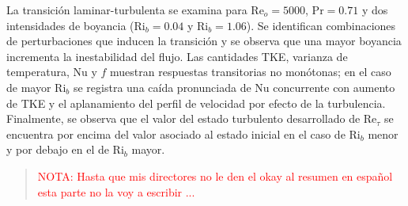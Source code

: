 \begin{resumen}

La transición laminar-turbulenta se examina para $\mathrm{Re}_o=5000$, $\mathrm{Pr}=0\text{.}71$ y dos intensidades de boyancia ($\mathrm{Ri}_b=0\text{.}04$ y $\mathrm{Ri}_b=1\text{.}06$). Se identifican combinaciones de perturbaciones que inducen la transición y se observa que una mayor boyancia incrementa la inestabilidad del flujo. Las cantidades TKE, varianza de temperatura, Nu y $f$ muestran respuestas transitorias no monótonas; en el caso de mayor $\mathrm{Ri}_b$ se registra una caída pronunciada de Nu concurrente con aumento de TKE y el aplanamiento del perfil de velocidad por efecto de la turbulencia. Finalmente, se observa que el valor del estado turbulento desarrollado de $\mathrm{Re}_\tau$ se encuentra por encima del valor asociado al estado inicial en el caso de $\mathrm{Ri}_b$ menor y por debajo en el de $\mathrm{Ri}_b$ mayor.

\end{resumen}


\begin{abstract}%
\textcolor{red}{NOTA: Hasta que mis directores no le den el okay al resumen en español esta parte no la voy a escribir ...}
\end{abstract}



